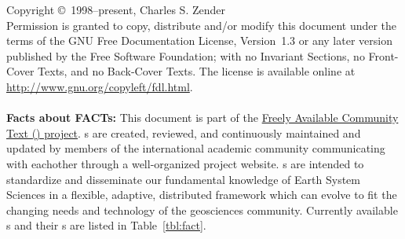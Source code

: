 \documentclass[12pt]{article}
\begin{document}
\bigskip\noindent
Copyright \copyright\ 1998--present, Charles S. Zender\\
Permission is granted to copy, distribute and/or modify this document
under the terms of the GNU Free Documentation License, Version~1.3
or any later version published by the Free Software Foundation;
with no Invariant Sections, no Front-Cover Texts, and no Back-Cover
Texts.
The license is available online at
\url{http://www.gnu.org/copyleft/fdl.html}.
\\
\\
\textbf{Facts about FACTs:}
This document is part of the 
\href{http://dust.ess.uci.edu/facts}{Freely Available Community Text () project}.
s are created, reviewed, and continuously maintained and updated
by members of the international academic community communicating with
eachother through a well-organized project website. 
s are intended to standardize and disseminate our fundamental
knowledge of Earth System Sciences in a flexible, adaptive,
distributed framework which can evolve to fit the changing needs and
technology of the geosciences community. 
Currently available s and their s are listed in
Table~\ref{tbl:fact}. 
\end{document}
